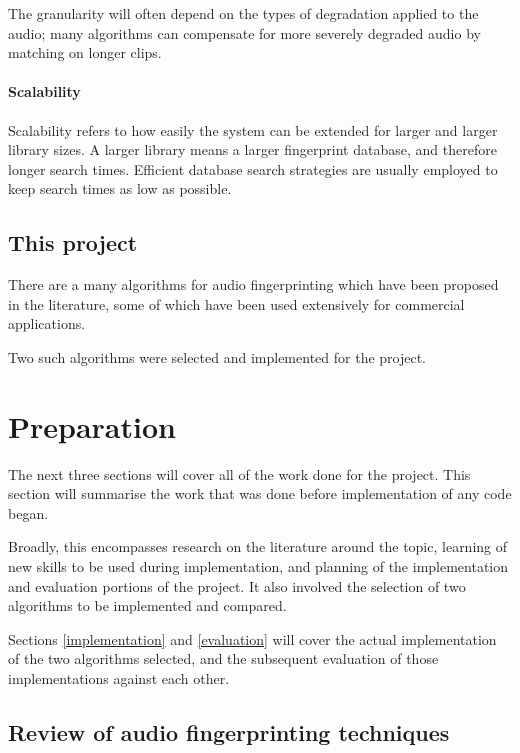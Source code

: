 \documentclass[12pt,a4paper,twoside,openright]{report}
\begin{document}
The granularity will often depend on the types of degradation applied to the audio; many algorithms can compensate for more severely degraded audio by matching on longer clips.

\subsubsection{Scalability}

Scalability refers to how easily the system can be extended for larger and larger library sizes. A larger library means a larger fingerprint database, and therefore longer search times. Efficient database search strategies are usually employed to keep search times as low as possible.


\section{This project}

There are a many algorithms for audio fingerprinting which have been proposed in the literature, some of which have been used extensively for commercial applications. 

Two such algorithms were selected and implemented for the project.



\chapter{Preparation}
\label{preparation}

The next three sections will cover all of the work done for the project. This section will summarise the work that was done before implementation of any code began. 

Broadly, this encompasses research on the literature around the topic, learning of new skills to be used during implementation, and planning of the implementation and evaluation portions of the project. It also involved the selection of two algorithms to be implemented and compared.

Sections \ref{implementation} and \ref{evaluation} will cover the actual implementation of the two algorithms selected, and the subsequent evaluation of those implementations against each other.


\section{Review of audio fingerprinting techniques}
\end{document}
